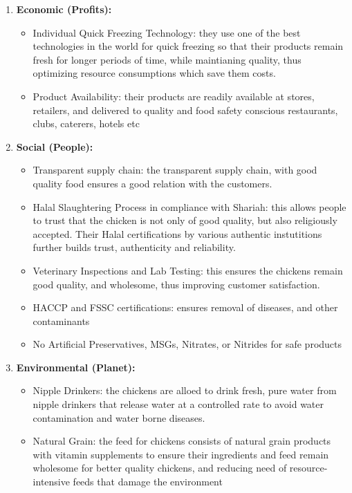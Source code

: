 \documentclass[addpoints]{exam}
\begin{document}
\begin{sloppypar}
\begin{questions}
\begin{solution}
        \begin{enumerate}
            \item \textbf{Economic (Profits):} \begin{itemize}
                \item Individual Quick Freezing Technology: they use one of the best technologies in the world for quick freezing so that their products remain fresh for longer periods of time, while maintianing quality, thus optimizing resource consumptions which save them costs.
                \item Product Availability: their products are readily available at stores, retailers, and delivered to quality and food safety conscious restaurants, clubs, caterers, hotels etc
            \end{itemize}
            \item \textbf{Social (People):} \begin{itemize}
                \item Transparent supply chain: the transparent supply chain, with good quality food ensures a good relation with the customers.
                \item Halal Slaughtering Process in compliance with Shariah: this allows people to trust that the chicken is not only of good quality, but also religiously accepted. Their Halal certifications by various authentic instutitions further builds trust, authenticity and reliability.
                \item Veterinary Inspections and Lab Testing: this ensures the chickens remain good quality, and wholesome, thus improving customer satisfaction. 
                \item HACCP and FSSC certifications: ensures removal of diseases, and other contaminants
                \item No Artificial Preservatives, MSGs, Nitrates, or Nitrides for safe products
            \end{itemize}
            \item \textbf{Environmental (Planet):} \begin{itemize}
                \item Nipple Drinkers: the chickens are alloed to drink fresh, pure water from nipple drinkers that release water at a controlled rate to avoid water contamination and water borne diseases.
                \item Natural Grain: the feed for chickens consists of natural grain products with vitamin supplements to ensure their ingredients and feed remain wholesome for better quality chickens, and reducing need of resource-intensive feeds that damage the environment
            \end{itemize}
        \end{enumerate}
    \end{solution}


\end{questions}
\end{sloppypar}
\end{document}
